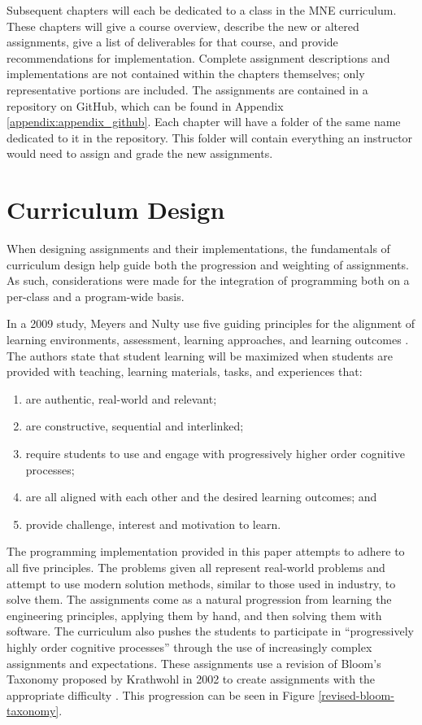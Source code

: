 Subsequent chapters will each be dedicated to a class in the MNE curriculum. These chapters
will give a course overview, describe the new or altered assignments, give a list
of deliverables for that course, and provide recommendations for implementation. Complete 
assignment descriptions and implementations
are not contained within the chapters themselves; only representative portions are included.
The assignments are contained in a repository on GitHub, which can be found in Appendix 
\ref{appendix:appendix_github}. Each chapter will have a folder of the same name dedicated 
to it in the repository. This folder will contain everything an instructor would need to assign 
and grade the new assignments.

\section{Curriculum Design}

When designing assignments and their implementations, the fundamentals of curriculum design
help guide both the progression and weighting of assignments. As such, considerations were
made for the integration of programming both on a per-class and a program-wide basis.

In a 2009 study, Meyers and Nulty use five guiding principles for the alignment of learning
environments, assessment, learning approaches, and learning outcomes \cite{5-cd-principles}.
The authors state that student learning will be maximized when students are provided
with teaching, learning materials, tasks, and experiences that:
\begin{enumerate}
    \item are authentic, real-world and relevant;
    \item are constructive, sequential and interlinked;
    \item require students to use and engage with progressively higher order cognitive 
    processes;
    \item are all aligned with each other and the desired learning outcomes; and
    \item provide challenge, interest and motivation to learn. \cite{5-cd-principles}
\end{enumerate}

The programming implementation provided in this paper attempts to adhere to all five
principles. The problems given all represent real-world problems and attempt to use
modern solution methods, similar to those used in industry, to solve them. The assignments
come as a natural progression from learning the engineering principles, applying them by
hand, and then solving them with software. The curriculum also pushes the students to 
participate in ``progressively highly order cognitive processes'' through the use of 
increasingly complex assignments and expectations. These assignments use a revision of
Bloom's Taxonomy proposed by Krathwohl in 2002 to create assignments with the appropriate
difficulty \cite{revised-bloom}. This progression can be seen in Figure \ref{revised-bloom-taxonomy}.

